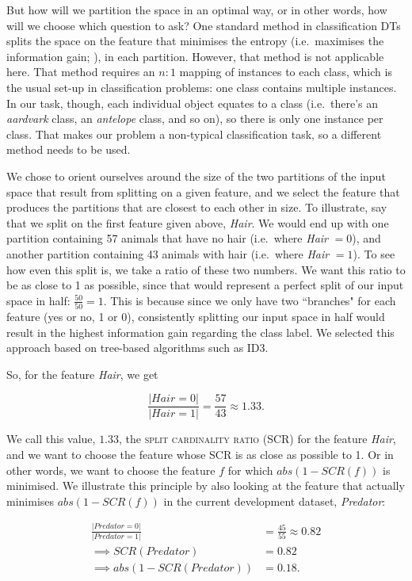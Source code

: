 \documentclass[a4paper,12pt]{article}
\begin{document}
But how will we partition the space in an optimal way, or in other words, how will we choose which question to ask?
One standard method in classification DTs splits the space on the feature that minimises the entropy (i.e.\ maximises the information gain; \citealt{Quinlan1986}), in each partition.
However, that method is not applicable here.
That method requires an $n : 1$ mapping of instances to each class, which is the usual set-up in classification problems: one class contains multiple instances.
In our task, though, each individual object equates to a class (i.e.\ there's an \textit{aardvark} class, an \textit{antelope} class, and so on), so there is only one instance per class.
That makes our problem a non-typical classification task, so a different method needs to be used.

We chose to orient ourselves around the size of the two partitions of the input space that result from splitting on a given feature, and we select the feature that produces the partitions that are closest to each other in size.
To illustrate, say that we split on the first feature given above, \textit{Hair}.
We would end up with one partition containing 57 animals that have no hair (i.e.\ where \textit{Hair} $= 0$), and another partition containing 43 animals with hair (i.e.\ where \textit{Hair} $= 1$).
To see how even this split is, we take a ratio of these two numbers.
We want this ratio to be as close to 1 as possible, since that would represent a perfect split of our input space in half: $\frac{50}{50} = 1$.
This is because since we only have two ``branches" for each feature (yes or no, 1 or 0), consistently splitting our input space in half would result in the highest information gain regarding the class label. We selected this approach based on tree-based algorithms such as ID3.

So, for the feature \textit{Hair}, we get

$$\frac{|Hair = 0|}{|Hair = 1|} = \frac{57}{43} \approx 1.33.$$

We call this value, $1.33$, the \textsc{split cardinality ratio} (SCR) for the feature \textit{Hair}, and we want to choose the feature whose SCR is as close as possible to 1.
Or in other words, we want to choose the feature $f$ for which $abs(1 - SCR(f))$ is minimised.
We illustrate this principle by also looking at the feature that actually minimises  $abs(1 - SCR(f))$ in the current development dataset, \textit{Predator}:

\begin{align*}
\frac{|Predator = 0|}{|Predator = 1|} &= \frac{45}{55} \approx 0.82 \\
\implies SCR(Predator) & = 0.82\\
\implies abs(1 - SCR(Predator)) &= 0.18.
\end{align*}
\end{document}
